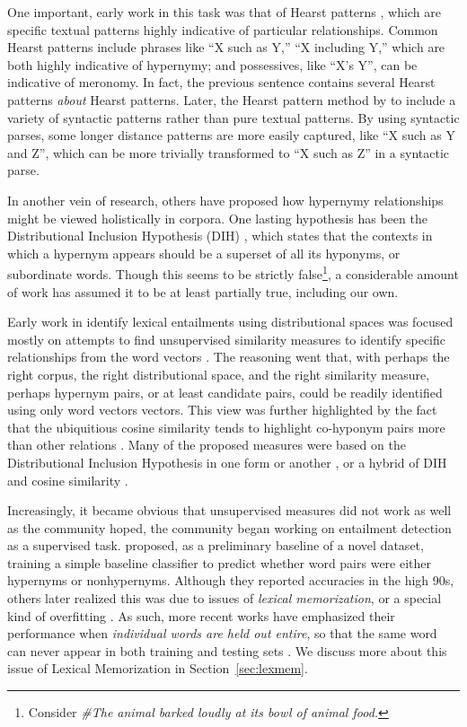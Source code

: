 \documentclass[12pt]{article}
\begin{document}
One important, early work in this task was that of Hearst patterns
\cite{hearst:1992:coling}, which are specific textual patterns highly
indicative of particular relationships. Common Hearst patterns include
phrases like ``X such as Y,'' ``X including Y,'' which are both highly
indicative of hypernymy; and possessives, like ``X's Y'', can be indicative
of meronomy. In fact, the previous sentence contains several Hearst patterns
{\em about} Hearst patterns. Later, the Hearst pattern method by
 to include a variety of syntactic patterns rather than
pure textual patterns. By using syntactic parses, some longer distance patterns
are more easily captured, like ``X such as Y and Z'', which can be more
trivially transformed to ``X such as Z'' in a syntactic parse.

In another vein of research, others have proposed how
hypernymy relationships might be viewed holistically in corpora.
One lasting hypothesis has been the Distributional Inclusion Hypothesis (DIH)
\cite{zhitomirsky-geffet:2005:acl}, which states that the contexts in which a
hypernym appears should be a superset of all its hyponyms, or subordinate
words. Though this seems to be strictly false\footnote{Consider {\em \#The
animal barked loudly at its bowl of animal food.}}, a considerable amount of
work has assumed it to be at least partially true, including our own.

Early work in identify lexical entailments using distributional spaces was
focused mostly on attempts to find unsupervised similarity measures to identify
specific relationships from the word vectors
\cite{weeds:2004:coling,clarke:2009:gems,kotlerman:2010:nle,lenci:2012:starsem,santus:2013:thesis}.
The reasoning went that, with perhaps the right corpus, the right
distributional space, and the right similarity measure, perhaps hypernym pairs,
or at least candidate pairs, could be readily identified using only word
vectors vectors. This view was further highlighted by the fact that the
ubiquitious cosine similarity tends to highlight co-hyponym pairs more than
other relations \cite{baroni:2011:gems}. Many of the proposed measures were
based on the Distributional Inclusion Hypothesis in one form or another
\cite{clarke:2009:gems}, or a hybrid of DIH and cosine similarity
\cite{kotlerman:2010:nle,lenci:2012:starsem}.

Increasingly, it became obvious that unsupervised measures did not work
as well as the community hoped, the community began working
on entailment detection as a supervised task. 
proposed, as a preliminary baseline of a novel dataset, training a simple
baseline classifier to predict whether word pairs were either hypernyms or
nonhypernyms. Although they reported accuracies in the high 90s, others later
realized this was due to issues of {\em lexical memorization}, or a special
kind of overfitting
\cite{roller:2014:coling,weeds:2014:coling,levy:2015:naacl}. As such, more
recent works have emphasized their performance when {\em individual words are
held out entire}, so that the same word can never appear in both training and
testing sets \cite{roller:2014:coling,kruszewski:2015:tacl,levy:2015:naacl}.
We discuss more about this issue of Lexical Memorization in
Section~\ref{sec:lexmem}.
\end{document}
